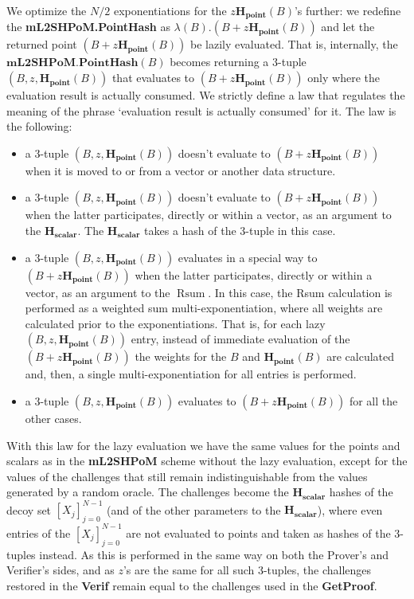 \documentclass{mathcryptology} %
\DeclareMathOperator{\Rsum}{Rsum}
\newcommand{\Hpoint}{\textbf{H}_{\textbf{point}}}
\newcommand{\Hscalar}{\textbf{H}_{\textbf{scalar}}}
\theoremstyle{title}
\theoremstyle{titleof}
\begin{document}
    We optimize the $N/2$ exponentiations for the $z\Hpoint\left(B\right)$'s further: we redefine the \textbf{mL2SHPoM.PointHash} as $\lambda\left(B\right).\left(B+z\Hpoint\left(B\right)\right)$ and let the returned point $\left(B+z\Hpoint\left(B\right)\right)$ be lazily evaluated.
    That is, internally, the $\textbf{mL2SHPoM.PointHash}\left(B\right)$ becomes returning a 3-tuple $\left(B, z, \Hpoint\left(B\right)\right)$ that evaluates to $\left(B+z\Hpoint\left(B\right)\right)$ only where the evaluation result is actually consumed. We strictly define a law that regulates the meaning of the phrase `evaluation result is actually consumed' for it. The law is the following:
    \begin{itemize}
        \item a 3-tuple $\left(B, z, \Hpoint\left(B\right)\right)$ doesn't evaluate to $\left(B+z\Hpoint\left(B\right)\right)$ when it is moved to or from a vector or another data structure.
        \item a 3-tuple $\left(B, z, \Hpoint\left(B\right)\right)$ doesn't evaluate to $\left(B+z\Hpoint\left(B\right)\right)$ when the latter participates, directly or within a vector, as an argument to the $\Hscalar$. The $\Hscalar$ takes a hash of the 3-tuple in this case.
        \item a 3-tuple $\left(B, z, \Hpoint\left(B\right)\right)$ evaluates in a special way to $\left(B+z\Hpoint\left(B\right)\right)$ when the latter participates, directly or within a vector, as an argument to the $\Rsum$. In this case, the Rsum calculation is performed as a weighted sum multi-exponentiation, where all weights are calculated prior to the exponentiations. That is, for each lazy $\left(B, z, \Hpoint\left(B\right)\right)$ entry, instead of immediate evaluation of the $\left(B+z\Hpoint\left(B\right)\right)$ the weights for the $B$ and $\Hpoint\left(B\right)$ are calculated and, then, a single multi-exponentiation for all entries is performed.
        \item a 3-tuple $\left(B, z, \Hpoint\left(B\right)\right)$ evaluates to $\left(B+z\Hpoint\left(B\right)\right)$ for all the other cases.
    \end{itemize}
    With this law for the lazy evaluation we have the same values for the points and scalars as in the \textbf{mL2SHPoM} scheme without the lazy evaluation, except for the values of the challenges that still remain indistinguishable from the values generated by a random oracle.
    The challenges become the $\Hscalar$ hashes of the decoy set ${\left[X_{j}\right]}_{j=0}^{N-1}$ (and of the other parameters to the $\Hscalar$), where even entries of the ${\left[X_{j}\right]}_{j=0}^{N-1}$ are not evaluated to points and taken as hashes of the 3-tuples instead. As this is performed in the same way on both the Prover's and Verifier's sides, and as $z$'s are the same for all such 3-tuples, the challenges restored in the \textbf{Verif}
    remain equal to the challenges used in the \textbf{GetProof}.
\end{document}
